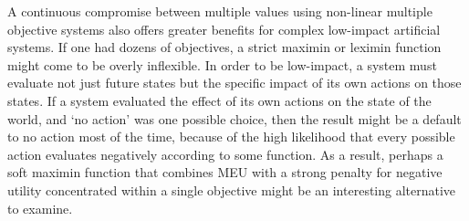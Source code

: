 A continuous compromise between multiple values using non-linear multiple objective systems also offers greater benefits for complex low-impact artificial systems. If one had dozens of objectives, a strict maximin or leximin function might come to be overly inflexible. In order to be low-impact, a system must evaluate not just future states but the specific impact of its own actions on those states. If a system evaluated the effect of its own actions on the state of the world, and `no action' was one possible choice, then the result might be a default to no action most of the time, because of the high likelihood that every possible action evaluates negatively according to some function. As a result, perhaps a soft maximin function that combines MEU with a strong penalty for negative utility concentrated within a single objective might be an interesting alternative to examine.

 

